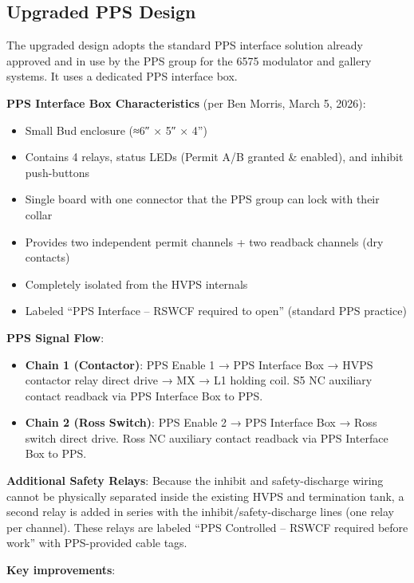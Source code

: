 \subsection{Upgraded PPS Design}\label{upgraded-pps-design}

The upgraded design adopts the standard PPS interface solution already approved and in use by the PPS group for the 6575 modulator and gallery systems. It uses a dedicated PPS interface box.

\textbf{PPS Interface Box Characteristics} (per Ben Morris, March 5, 2026):

\begin{itemize}
\tightlist
\item
  Small Bud enclosure (≈6″ × 5″ × 4'')
\item
  Contains 4 relays, status LEDs (Permit A/B granted \& enabled), and inhibit push-buttons
\item
  Single board with one connector that the PPS group can lock with their collar
\item
  Provides two independent permit channels + two readback channels (dry contacts)
\item
  Completely isolated from the HVPS internals
\item
  Labeled ``PPS Interface -- RSWCF required to open'' (standard PPS practice)
\end{itemize}

\textbf{PPS Signal Flow}:

\begin{itemize}
\tightlist
\item
  \textbf{Chain 1 (Contactor)}: PPS Enable 1 → PPS Interface Box → HVPS contactor relay direct drive → MX → L1 holding coil. S5 NC auxiliary contact readback via PPS Interface Box to PPS.
\item
  \textbf{Chain 2 (Ross Switch)}: PPS Enable 2 → PPS Interface Box → Ross switch direct drive. Ross NC auxiliary contact readback via PPS Interface Box to PPS.
\end{itemize}

\textbf{Additional Safety Relays}: Because the inhibit and safety-discharge wiring cannot be physically separated inside the existing HVPS and termination tank, a second relay is added in series with the inhibit/safety-discharge lines (one relay per channel). These relays are labeled ``PPS Controlled -- RSWCF required before work'' with PPS-provided cable tags.

\textbf{Key improvements}:

